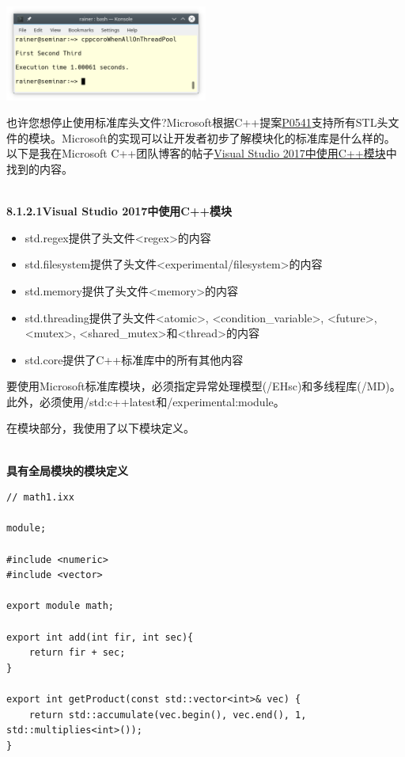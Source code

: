 \begin{center}
\includegraphics[width=0.5\textwidth]{content/5/chapter8/images/6.png}\\
\end{center}


也许您想停止使用标准库头文件?Microsoft根据C++提案\href{http://www.open-std.org/JTC1/SC22/WG21/docs/papers/2017/p0581r0.pdf}{P0541}支持所有STL头文件的模块。Microsoft的实现可以让开发者初步了解模块化的标准库是什么样的。以下是我在Microsoft C++团队博客的帖子\href{https://devblogs.microsoft.com/cppblog/cpp-modules-in-visual-studio-2017/}{Visual Studio 2017中使用C++模块}中找到的内容。

\hspace*{\fill} \\ %
\noindent
\textbf{8.1.2.1\hspace{0.2cm}Visual Studio 2017中使用C++模块}

\begin{itemize}
\item 
std.regex提供了头文件<regex>的内容

\item 
std.filesystem提供了头文件<experimental/filesystem>的内容

\item 
std.memory提供了头文件<memory>的内容

\item 
std.threading提供了头文件<atomic>, <condition\_variable>, <future>, <mutex>, <shared\_mutex>和<thread>的内容

\item 
std.core提供了C++标准库中的所有其他内容
\end{itemize}

要使用Microsoft标准库模块，必须指定异常处理模型(/EHsc)和多线程库(/MD)。此外，必须使用/std:c++latest和/experimental:module。

在模块部分，我使用了以下模块定义。

\hspace*{\fill} \\ %
\noindent
\textbf{具有全局模块的模块定义}
\begin{lstlisting}[style=styleCXX]
// math1.ixx

module;

#include <numeric>
#include <vector>

export module math;

export int add(int fir, int sec){
	return fir + sec;
}

export int getProduct(const std::vector<int>& vec) {
	return std::accumulate(vec.begin(), vec.end(), 1, std::multiplies<int>());
}
\end{lstlisting}

